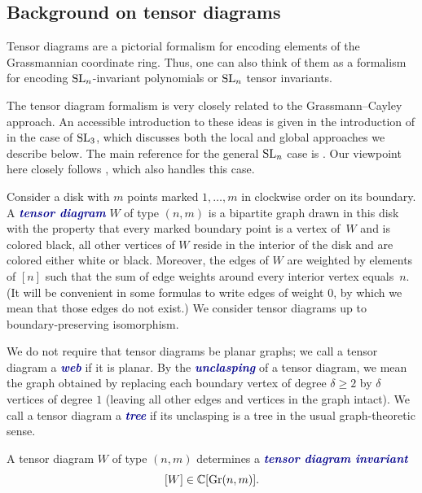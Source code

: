 \documentclass[ALCO, Unicode]{cedram}
\numberwithin{equation}{section}
\newcommand{\newword}[1]{\textcolor{darkblue}{\textbf{\emph{#1}}}}
\begin{document}
\subsection{Background on tensor diagrams}\label{sec:TDbackground}
Tensor diagrams are a pictorial formalism for encoding elements of the Grassmannian coordinate ring. Thus, one can also think of them as a formalism for encoding ${\rm SL}_n$-invariant polynomials or ${\rm SL}_n$ tensor invariants.


The tensor diagram formalism is very closely related to the Grassmann--Cayley approach. An accessible introduction to these ideas is given in the introduction of \cite{Fomin.Pylyavskyy} in the case of ${\rm SL}_3$, which discusses both the local and global approaches we describe below. The main reference for the general ${\rm SL}_n$ case is   \cite{Cautis.Kamnitzer.Morrison}. Our viewpoint here closely follows \cite{Fraser.Lam.Le}, which also handles this case.


\begin{definition}\label{defn:tensordiagram}
Consider a disk with $m$ points marked $1,\dots,m$ in clockwise order on its boundary. A \newword{tensor diagram} $W$ of type $(n,m)$ is a bipartite graph drawn in this disk with the property that every marked boundary point is a vertex of~$W$ and is colored black, all other vertices of $W$ reside in the interior of the disk and are colored either white or black. Moreover, the edges of $W$ are weighted by elements of $[n]$ such that the sum of edge weights around every interior vertex equals~$n$. (It will be convenient in some formulas to write edges of weight $0$, by which we mean that those edges do not exist.) We consider tensor diagrams up to boundary-preserving isomorphism.
\end{definition}

We do not require that tensor diagrams be planar graphs; we call a tensor diagram a \newword{web} if it is planar. By the \newword{unclasping} of a tensor diagram, we mean the graph obtained by replacing each boundary vertex of degree $\delta \geq 2$ by $\delta$ vertices of degree $1$ (leaving all other edges and vertices in the graph intact). We call a tensor diagram a \newword{tree} if its unclasping is a tree in the usual graph-theoretic sense.

A tensor diagram $W$ of type $(n,m)$ determines a \newword{tensor diagram invariant} 
\begin{equation}\label{eq:globaldefinition}
[W] \in \mathbb{C}[{\rm Gr}(n,m)].
\end{equation}
\end{document}
